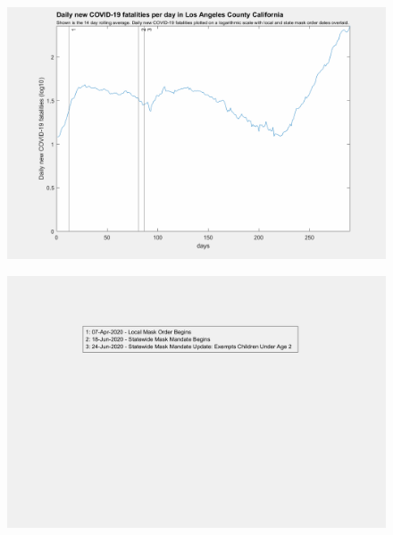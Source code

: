 \documentclass[]{article}
\begin{document}
\begin{figure}[!h]
	\includegraphics[width=\linewidth]{images/los_angeles_mask_order_fatalities_log.png}
	\caption{}
	\label{fig:images/los_angeles_mask_order_fatalities_logLabel}
\end{figure}

\begin{figure}[!h]
	\includegraphics[width=\linewidth]{legends/san_bernardino_mask_order_legend.png}
	\caption{}
	\label{fig:legends/san_bernardino_mask_order_legendLabel}
\end{figure}
\end{document}
